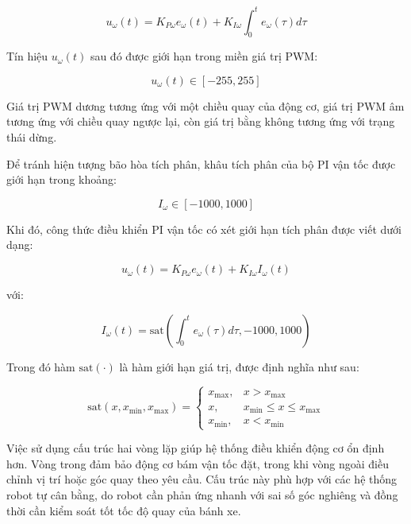 \begin{equation}
    u_{\omega}(t)
    =
    K_{P\omega} e_{\omega}(t)
    +
    K_{I\omega} \int_{0}^{t} e_{\omega}(\tau)d\tau
\end{equation}

Tín hiệu $u_{\omega}(t)$ sau đó được giới hạn trong miền giá trị PWM:

\begin{equation}
    u_{\omega}(t) \in [-255, 255]
\end{equation}

Giá trị PWM dương tương ứng với một chiều quay của động cơ, giá trị PWM âm tương ứng với chiều quay ngược lại, còn giá trị bằng không tương ứng với trạng thái dừng.

Để tránh hiện tượng bão hòa tích phân, khâu tích phân của bộ PI vận tốc được giới hạn trong khoảng:

\begin{equation}
    I_{\omega} \in [-1000, 1000]
\end{equation}

Khi đó, công thức điều khiển PI vận tốc có xét giới hạn tích phân được viết dưới dạng:

\begin{equation}
    u_{\omega}(t)
    =
    K_{P\omega} e_{\omega}(t)
    +
    K_{I\omega} I_{\omega}(t)
\end{equation}

với:

\begin{equation}
    I_{\omega}(t)
    =
    \text{sat}
    \left(
    \int_{0}^{t} e_{\omega}(\tau)d\tau,
    -1000,
    1000
    \right)
\end{equation}

Trong đó hàm $\text{sat}(\cdot)$ là hàm giới hạn giá trị, được định nghĩa như sau:

\begin{equation}
\text{sat}(x,x_{\min},x_{\max}) =
\begin{cases}
x_{\max}, & x > x_{\max} \\
x, & x_{\min} \leq x \leq x_{\max} \\
x_{\min}, & x < x_{\min}
\end{cases}
\end{equation}

Việc sử dụng cấu trúc hai vòng lặp giúp hệ thống điều khiển động cơ ổn định hơn. Vòng trong đảm bảo động cơ bám vận tốc đặt, trong khi vòng ngoài điều chỉnh vị trí hoặc góc quay theo yêu cầu. Cấu trúc này phù hợp với các hệ thống robot tự cân bằng, do robot cần phản ứng nhanh với sai số góc nghiêng và đồng thời cần kiểm soát tốt tốc độ quay của bánh xe.

